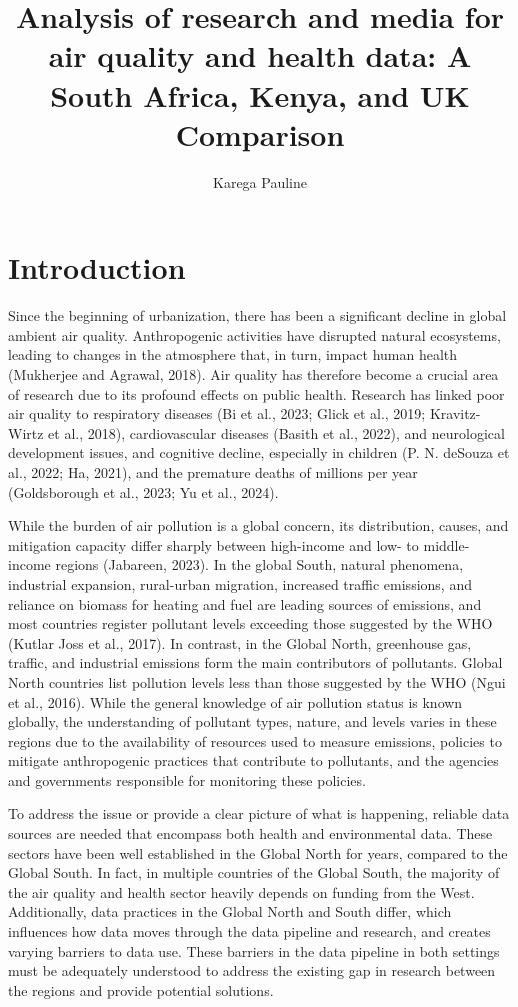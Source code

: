 \documentclass{article}
\title{Analysis of research and media for air quality and health data: A South Africa, Kenya, and UK Comparison}
\author{Karega Pauline}
\begin{document}
\maketitle

\section{Introduction}

Since the beginning of urbanization, there has been a significant decline in global ambient air quality. Anthropogenic activities have disrupted natural ecosystems, leading to changes in the atmosphere that, in turn, impact human health (Mukherjee and Agrawal, 2018). Air quality has therefore become a crucial area of research due to its profound effects on public health. Research has linked poor air quality to respiratory diseases (Bi et al., 2023; Glick et al., 2019; Kravitz-Wirtz et al., 2018), cardiovascular diseases (Basith et al., 2022), and neurological development issues, and cognitive decline, especially in children (P. N. deSouza et al., 2022; Ha, 2021), and the premature deaths of millions per year (Goldsborough et al., 2023; Yu et al., 2024). 

While the burden of air pollution is a global concern, its distribution, causes, and mitigation capacity differ sharply between high-income and low- to middle-income regions (Jabareen, 2023). In the global South, natural phenomena, industrial expansion, rural-urban migration, increased traffic emissions, and reliance on biomass for heating and fuel are leading sources of emissions, and most countries register pollutant levels exceeding those suggested by the WHO (Kutlar Joss et al., 2017). In contrast, in the Global North, greenhouse gas, traffic, and industrial emissions form the main contributors of pollutants. Global North countries list pollution levels less than those suggested by the WHO (Ngui et al., 2016). While the general knowledge of air pollution status is known globally, the understanding of pollutant types, nature, and levels varies in these regions due to the availability of resources used to measure emissions, policies to mitigate anthropogenic practices that contribute to pollutants, and the agencies and governments responsible for monitoring these policies. 

To address the issue or provide a clear picture of what is happening, reliable data sources are needed that encompass both health and environmental data. These sectors have been well established in the Global North for years, compared to the Global South. In fact, in multiple countries of the Global South, the majority of the air quality and health sector heavily depends on funding from the West. Additionally, data practices in the Global North and South differ, which influences how data moves through the data pipeline and research, and creates varying barriers to data use. These barriers in the data pipeline in both settings must be adequately understood to address the existing gap in research between the regions and provide potential solutions. 
\end{document}

